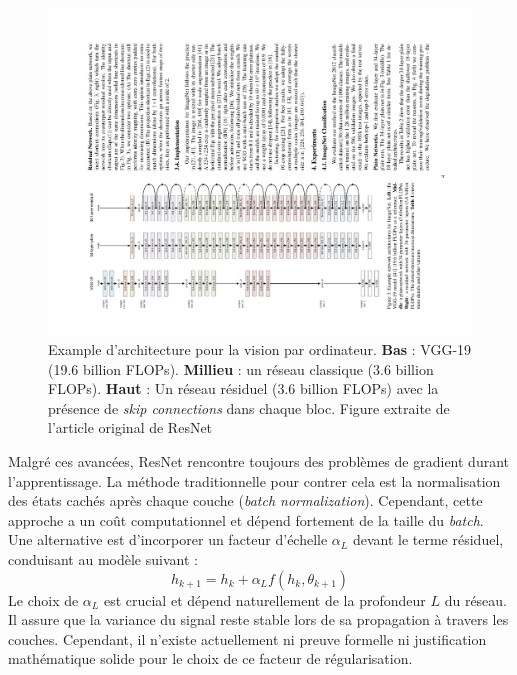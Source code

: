 \begin{figure}[H]
    \centering
    \includegraphics[width=.9\textwidth]{figs/resnet_arch.pdf}
    \caption{Example d'architecture pour la vision par ordinateur. \textbf{Bas} : VGG-19 (19.6 billion FLOPs). \textbf{Millieu} : un réseau classique (3.6 billion FLOPs). \textbf{Haut} : Un réseau résiduel (3.6 billion FLOPs) avec la présence de \textit{skip connections} dans chaque bloc. Figure extraite de l'article original de ResNet \citep{resnet}}
    \label{fig:resnet}
\end{figure}

Malgré ces avancées, ResNet rencontre toujours des problèmes de gradient durant l'apprentissage. La méthode traditionnelle pour contrer cela est la normalisation des états cachés après chaque couche (\textit{batch normalization}). Cependant, cette approche a un coût computationnel et dépend fortement de la taille du \textit{batch}. Une alternative est d'incorporer un facteur d'échelle $\alpha_L$ devant le terme résiduel, conduisant au modèle suivant :
\begin{equation}\label{resnet_equation}
    h_{k+1} = h_k + \alpha_L f(h_k, \theta_{k+1})
\end{equation}
Le choix de $\alpha_L$ est crucial et dépend naturellement de la profondeur $L$ du réseau. Il assure que la variance du signal reste stable lors de sa propagation à travers les couches. Cependant, il n'existe actuellement ni preuve formelle ni justification mathématique solide pour le choix de ce facteur de régularisation.

